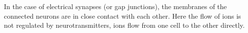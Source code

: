 \documentclass[class={myRUCProject}, crop=false]{standalone}
\begin{document}

In the case of electrical synapses (or gap junctions), the membranes of the connected neurons are in close contact with each other. Here the flow of ions is not regulated by neurotransmitters, ions flow from one cell to the other directly.
\end{document}
